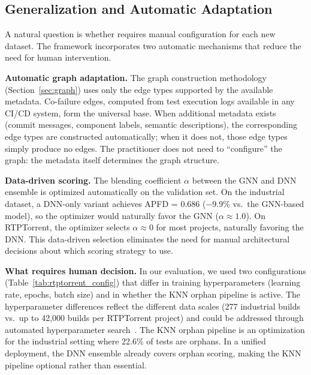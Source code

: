 \subsection{Generalization and Automatic Adaptation}
\label{sec:boundary}

A natural question is whether \filopriori{} requires manual configuration for
each new dataset. The framework incorporates two automatic mechanisms that
reduce the need for human intervention.

\textbf{Automatic graph adaptation.} The graph construction methodology
(Section~\ref{sec:graph}) uses only the edge types supported by the available
metadata. Co-failure edges, computed from test execution logs available in any
CI/CD system, form the universal base. When additional metadata exists (commit
messages, component labels, semantic descriptions), the corresponding edge
types are constructed automatically; when it does not, those edge types simply
produce no edges. The practitioner does not need to ``configure'' the graph: the
metadata itself determines the graph structure.

\textbf{Data-driven scoring.} The blending coefficient $\alpha$ between
the GNN and DNN ensemble is optimized automatically on the validation set. On
the industrial dataset, a DNN-only variant achieves APFD = 0.686 ($-$9.9\%
vs.\ the GNN-based model), so the optimizer would naturally favor the GNN
($\alpha \approx 1.0$). On RTPTorrent, the optimizer selects $\alpha \approx 0$
for most projects, naturally favoring the DNN. This data-driven selection
eliminates the need for manual architectural decisions about which scoring
strategy to use.

\textbf{What requires human decision.} In our evaluation, we used two
configurations (Table~\ref{tab:rtptorrent_config}) that differ in training
hyperparameters (learning rate, epochs, batch size) and in whether the KNN
orphan pipeline is active. The hyperparameter differences reflect the different
data scales (277 industrial builds vs.\ up to 42,000 builds per RTPTorrent
project) and could be addressed through automated hyperparameter
search~\cite{bergstra2012random}. The KNN orphan pipeline is an optimization
for the industrial setting where 22.6\% of tests are orphans. In a unified
deployment, the DNN ensemble already covers orphan scoring, making the KNN
pipeline optional rather than essential.

